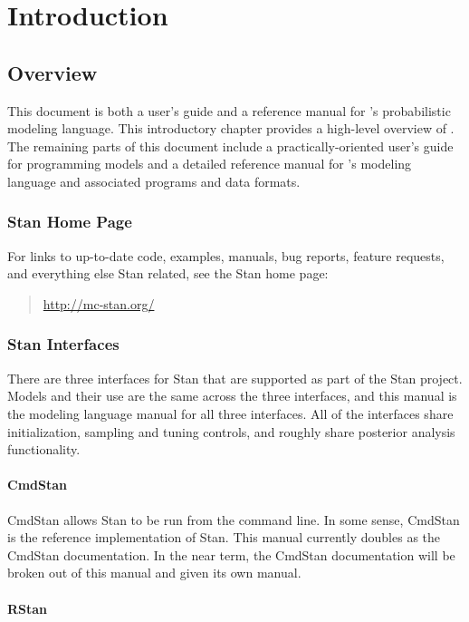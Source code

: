 \part{Introduction}


\chapter{Overview}

\noindent
This document is both a user's guide and a reference manual for
\Stan's probabilistic modeling language.  This introductory chapter
provides a high-level overview of \Stan. The remaining
parts of this document include a practically-oriented user's guide for
programming models and a detailed reference manual for \Stan's
modeling language and associated programs and data formats.

\section{Stan Home Page}

For links to up-to-date code, examples, manuals, bug reports,
feature requests, and everything else Stan related, see
the Stan home page:
%
\begin{quote}
\url{http://mc-stan.org/}
\end{quote}


\section{Stan Interfaces}

There are three interfaces for Stan that are supported as part of the
Stan project.  Models and their use are the same across the three
interfaces, and this manual is the modeling language manual for all
three interfaces.  All of the interfaces share initialization,
sampling and tuning controls, and roughly share posterior analysis
functionality.   

\subsection{CmdStan}

CmdStan allows Stan to be run from the command line.  In some sense,
CmdStan is the reference implementation of Stan.  This manual
currently doubles as the CmdStan documentation.  In the near term,
the CmdStan documentation will be broken out of this manual and given
its own manual.

\subsection{RStan}

